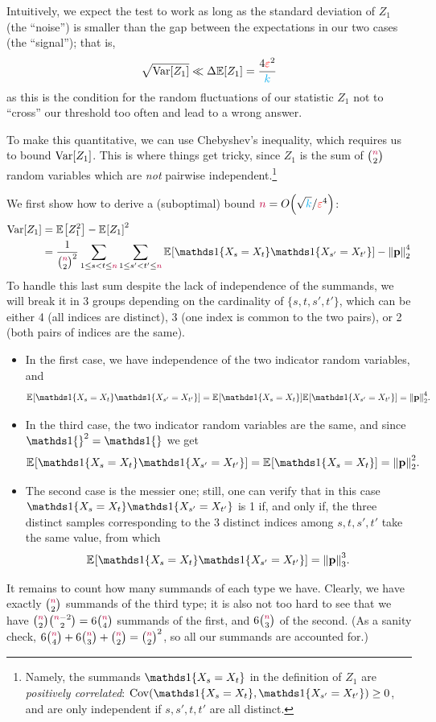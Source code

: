 Intuitively, we expect the test to work as long as the standard deviation of $Z_1$ (the ``noise'') is smaller than the gap between the expectations in our two cases (the ``signal''); that is,
\begin{equation}
  \label{eq:signal:to:noise}
      \sqrt{\Var[Z_1]} \ll \Delta \expect{Z_1} = \frac{4\dst^2}{\ab}
\end{equation}
as this is the condition for the random fluctuations of our statistic $Z_1$ not to ``cross'' our threshold too often and lead to a wrong answer.

To make this quantitative, we can use Chebyshev's inequality, which requires us to bound $\operatorname{Var}[Z_1]$. This is where things get tricky, since $Z_1$ is the sum of $\binom{{\textcolor{purple}{n}}}{2}$ random variables which are \emph{not} pairwise independent.\footnote{Namely, the summands $\indic{X_s=X_t}$ in the definition of $Z_1$ are \emph{positively correlated}: $\cov(\indic{X_s=X_t},\indic{X_{s'}=X_{t'}}) \geq 0$, and are only independent if $s,s',t,t'$ are all distinct.} 

We first show how to derive a (suboptimal) bound $\ns=\bigO{\sqrt{\ab}/\dst^4}$:
\begin{align*}
  \Var[Z_1] 
   &= \bEE{Z_1^2} - \bEE{Z_1}^2\\
   &= \frac{1}{\binom{\ns}{2}^2} \sum_{1\leq s < t \leq \ns}\sum_{1\leq s' < t' \leq \ns} \bEE{\indic{X_s=X_t}\indic{X_{s'}=X_{t'}}} - \normtwo{\p}^4
\end{align*}
To handle this last sum despite the lack of independence of the summands, we will break it in 3 groups depending on the cardinality of $\{s,t,s',t'\}$, which can be either 4 (all indices are distinct), 3 (one index is common to the two pairs), or 2 (both pairs of indices are the same).
\begin{itemize}
  \item In the first case, we have independence of the two indicator random variables, and 
  \[
    \bEE{\indic{X_s=X_t}\indic{X_{s'}=X_{t'}}} = \bEE{\indic{X_s=X_t}}\bEE{\indic{X_{s'}=X_{t'}}} = \normtwo{\p}^4.
  \]
  \item In the third case, the two indicator random variables are the same, and since $\indic{}^2=\indic{}$ we get
  \[
    \bEE{\indic{X_s=X_t}\indic{X_{s'}=X_{t'}}} = \bEE{\indic{X_s=X_t}} = \normtwo{\p}^2.
  \]
  \item The second case is the messier one; still, one can verify that in this case $\indic{X_s=X_t}\indic{X_{s'}=X_{t'}}$ is 1 if, and only if, the three distinct samples corresponding to the 3 distinct indices among $s,t,s',t'$ take the same value, from which
  \[
    \bEE{\indic{X_s=X_t}\indic{X_{s'}=X_{t'}}} = \norm{\p}_3^3.
  \]
\end{itemize}
It remains to count how many summands of each type we have. Clearly, we have exactly $\binom{{\textcolor{purple}{n}}}{2}$ summands of the third type; it is also not too hard to see that we have $\binom{{\textcolor{purple}{n}}}{2}\binom{{\textcolor{purple}{n}}-2}{2} = 6\binom{{\textcolor{purple}{n}}}{4}$ summands of the first, and $6\binom{{\textcolor{purple}{n}}}{3}$ of the second. (As a sanity check, $6\binom{{\textcolor{purple}{n}}}{4}+6\binom{{\textcolor{purple}{n}}}{3}+\binom{{\textcolor{purple}{n}}}{2} = \binom{{\textcolor{purple}{n}}}{2}^2$, so all our summands are accounted for.)

